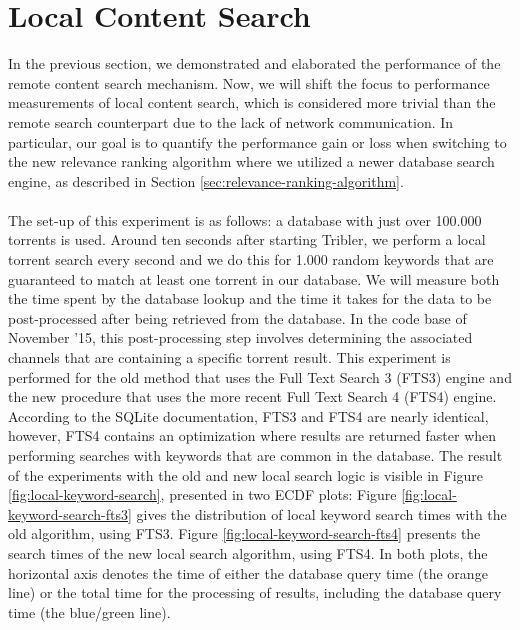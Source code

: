 \section{Local Content Search}
\label{sec:local-content-search}
In the previous section, we demonstrated and elaborated the performance of the remote content search mechanism. Now, we will shift the focus to performance measurements of local content search, which is considered more trivial than the remote search counterpart due to the lack of network communication. In particular, our goal is to quantify the performance gain or loss when switching to the new relevance ranking algorithm where we utilized a newer database search engine, as described in Section \ref{sec:relevance-ranking-algorithm}.\\\\
The set-up of this experiment is as follows: a database with just over 100.000 torrents is used. Around ten seconds after starting Tribler, we perform a local torrent search every second and we do this for 1.000 random keywords that are guaranteed to match at least one torrent in our database. We will measure both the time spent by the database lookup and the time it takes for the data to be post-processed after being retrieved from the database. In the code base of November '15, this post-processing step involves determining the associated channels that are containing a specific torrent result. This experiment is performed for the old method that uses the Full Text Search 3 (FTS3) engine and the new procedure that uses the more recent Full Text Search 4 (FTS4) engine. According to the SQLite documentation, FTS3 and FTS4 are nearly identical, however, FTS4 contains an optimization where results are returned faster when performing searches with keywords that are common in the database. The result of the experiments with the old and new local search logic is visible in Figure \ref{fig:local-keyword-search}, presented in two ECDF plots: Figure \ref{fig:local-keyword-search-fts3} gives the distribution of local keyword search times with the old algorithm, using FTS3. Figure \ref{fig:local-keyword-search-fts4} presents the search times of the new local search algorithm, using FTS4. In both plots, the horizontal axis denotes the time of either the database query time (the orange line) or the total time for the processing of results, including the database query time (the blue/green line).\\

